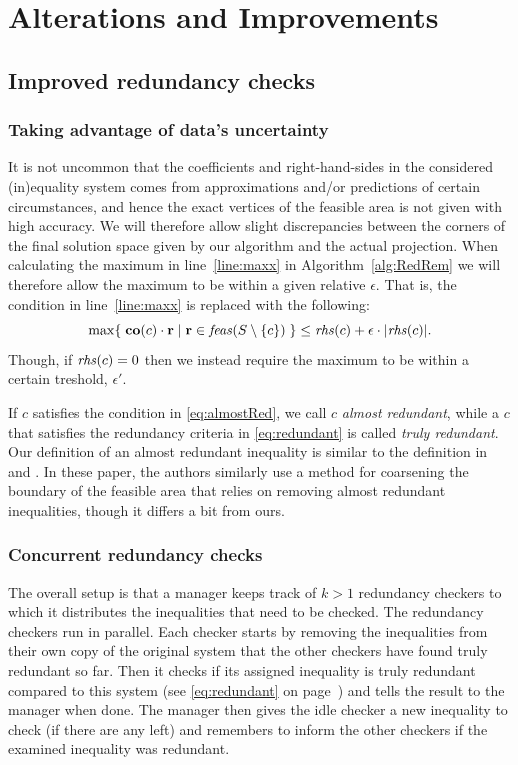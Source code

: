 \section{Alterations and Improvements}\label{sec:improvements}
\subsection{Improved redundancy checks}
\subsubsection{Taking advantage of data's uncertainty}\label{sec:uncertainty} 
It is not uncommon that the coefficients and right-hand-sides in the considered (in)equality system comes from approximations and/or predictions of certain circumstances, and hence the exact vertices of the feasible area is not given with high accuracy. We will therefore allow slight discrepancies between the corners of the final solution space given by our algorithm and the actual projection. 
When calculating the maximum in line~\ref{line:maxx} in Algorithm~\ref{alg:RedRem} we will therefore allow the maximum to be within a given relative $\epsilon$. That is, the condition in line~\ref{line:maxx} is replaced with the following:
\begin{equation}\label{eq:almostRed}
\max\{\;{\mathbf{co}(c)\cdot\mathbf{r}}\;|\;{\mathbf{r}\in \mathit{feas}(S\setminus\{c\})}\;\}\leq \mathit{rhs}(c) + \epsilon\cdot |\mathit{rhs}(c)|.
\end{equation}
Though, if $\mathit{rhs}(c)=0$ then we instead require the maximum to be within a certain treshold, $\epsilon'$. 

If $c$ satisfies the condition in \eqref{eq:almostRed}, we call $c$ \emph{almost redundant}, while a $c$ that satisfies the redundancy criteria in \eqref{eq:redundant} is called \emph{truly redundant}. Our definition of an almost redundant inequality is similar to the definition in \cite{lukatskii08} and \cite{shapot12}. In these paper, the authors similarly use a method for coarsening the boundary of the feasible area that relies on removing almost redundant inequalities, though it differs a bit from ours.  

\subsubsection{Concurrent redundancy checks}
The overall setup is that a manager keeps track of $k>1$ redundancy checkers to which it distributes the inequalities that need to be checked. The redundancy checkers run in parallel. Each checker starts by removing the inequalities from their own copy of the original system that the other checkers have found truly redundant so far. Then it checks if its assigned inequality is truly redundant compared to this system (see \eqref{eq:redundant} on page~\pageref{eq:redundant}) and tells the result to the manager when done. The manager then gives the idle checker a new inequality to check (if there are any left) and remembers to inform the other checkers if the examined inequality was redundant.

